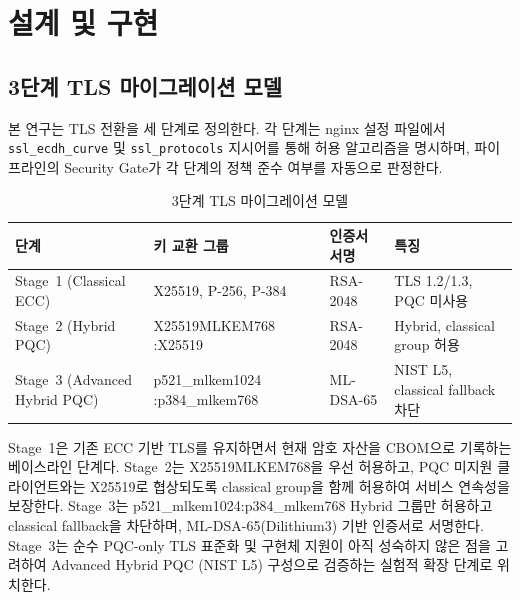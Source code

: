 \section{설계 및 구현}
\sloppy


\subsection{3단계 TLS 마이그레이션 모델}

본 연구는 TLS 전환을 세 단계로 정의한다.
각 단계는 nginx 설정 파일에서 \texttt{ssl\_ecdh\_curve} 및 \texttt{ssl\_protocols} 지시어를 통해 허용 알고리즘을 명시하며, 파이프라인의 Security Gate가 각 단계의 정책 준수 여부를 자동으로 판정한다.

\begin{table}[htbp]
\centering
\renewcommand{\arraystretch}{1.3}
\caption{3단계 TLS 마이그레이션 모델}
\label{tab:tls_stages}
\begin{tabular}{p{3.5cm}p{4cm}p{1.8cm}p{3cm}}
\toprule
단계 & 키 교환 그룹 & 인증서 서명 & 특징 \\
\midrule
Stage~1 \newline (Classical ECC)
  & X25519, P-256, P-384
  & RSA-2048
  & TLS 1.2/1.3, PQC 미사용 \\
Stage~2 \newline (Hybrid PQC)
  & X25519MLKEM768 \newline :X25519
  & RSA-2048
  & Hybrid, classical group 허용 \\
Stage~3 \newline (Advanced Hybrid PQC)
  & p521\_mlkem1024 \newline :p384\_mlkem768
  & ML-DSA-65
  & NIST L5, classical fallback 차단 \\
\bottomrule
\end{tabular}
\end{table}

Stage~1은 기존 ECC 기반 TLS를 유지하면서 현재 암호 자산을 CBOM으로 기록하는 베이스라인 단계다.
Stage~2는 X25519MLKEM768을 우선 허용하고, PQC 미지원 클라이언트와는 X25519로 협상되도록 classical group을 함께 허용하여 서비스 연속성을 보장한다.
Stage~3는 p521\_mlkem1024:p384\_mlkem768 Hybrid 그룹만 허용하고 classical fallback을 차단하며, ML-DSA-65(Dilithium3) 기반 인증서로 서명한다.
Stage~3는 순수 PQC-only TLS 표준화 및 구현체 지원이 아직 성숙하지 않은 점을 고려하여 Advanced Hybrid PQC (NIST L5) 구성으로 검증하는 실험적 확장 단계로 위치한다.

